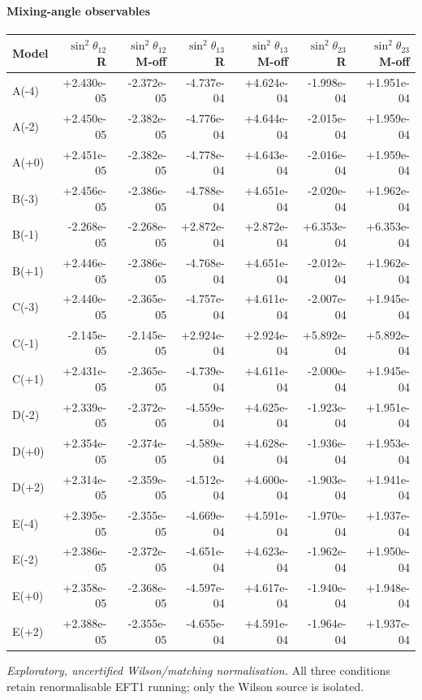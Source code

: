 \paragraph{Mixing-angle observables}
\begin{center}
\begin{tabular}{lrrrrrr}
\hline
Model & $\sin^2\theta_{12}$ R & $\sin^2\theta_{12}$ M-off & $\sin^2\theta_{13}$ R & $\sin^2\theta_{13}$ M-off & $\sin^2\theta_{23}$ R & $\sin^2\theta_{23}$ M-off \\
\hline
A(-4) & +2.430e-05 & -2.372e-05 & -4.737e-04 & +4.624e-04 & -1.998e-04 & +1.951e-04 \\
A(-2) & +2.450e-05 & -2.382e-05 & -4.776e-04 & +4.644e-04 & -2.015e-04 & +1.959e-04 \\
A(+0) & +2.451e-05 & -2.382e-05 & -4.778e-04 & +4.643e-04 & -2.016e-04 & +1.959e-04 \\
B(-3) & +2.456e-05 & -2.386e-05 & -4.788e-04 & +4.651e-04 & -2.020e-04 & +1.962e-04 \\
B(-1) & -2.268e-05 & -2.268e-05 & +2.872e-04 & +2.872e-04 & +6.353e-04 & +6.353e-04 \\
B(+1) & +2.446e-05 & -2.386e-05 & -4.768e-04 & +4.651e-04 & -2.012e-04 & +1.962e-04 \\
C(-3) & +2.440e-05 & -2.365e-05 & -4.757e-04 & +4.611e-04 & -2.007e-04 & +1.945e-04 \\
C(-1) & -2.145e-05 & -2.145e-05 & +2.924e-04 & +2.924e-04 & +5.892e-04 & +5.892e-04 \\
C(+1) & +2.431e-05 & -2.365e-05 & -4.739e-04 & +4.611e-04 & -2.000e-04 & +1.945e-04 \\
D(-2) & +2.339e-05 & -2.372e-05 & -4.559e-04 & +4.625e-04 & -1.923e-04 & +1.951e-04 \\
D(+0) & +2.354e-05 & -2.374e-05 & -4.589e-04 & +4.628e-04 & -1.936e-04 & +1.953e-04 \\
D(+2) & +2.314e-05 & -2.359e-05 & -4.512e-04 & +4.600e-04 & -1.903e-04 & +1.941e-04 \\
E(-4) & +2.395e-05 & -2.355e-05 & -4.669e-04 & +4.591e-04 & -1.970e-04 & +1.937e-04 \\
E(-2) & +2.386e-05 & -2.372e-05 & -4.651e-04 & +4.623e-04 & -1.962e-04 & +1.950e-04 \\
E(+0) & +2.358e-05 & -2.368e-05 & -4.597e-04 & +4.617e-04 & -1.940e-04 & +1.948e-04 \\
E(+2) & +2.388e-05 & -2.355e-05 & -4.655e-04 & +4.591e-04 & -1.964e-04 & +1.937e-04 \\
\hline
\end{tabular}
\end{center}
\noindent\emph{Exploratory, uncertified Wilson/matching normalisation.} 
All three conditions retain renormalisable EFT1 running; only the Wilson source is isolated.
